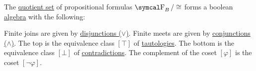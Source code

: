 \begin{Theorem}\label{thm:propositional_logic_boolean_algebra}
  The \hyperref[def:equivalence_relation]{quotient set} of propositional formulas \( \CF_B / \cong \) forms a boolean \hyperref[def:boolean_algebra]{algebra} with the following:
  \begin{ThmEnum}
     Finite joins are given by \hyperref[def:propositional_language/connectives/disjunction]{disjunctions (\( \vee \))}.
     Finite meets are given by \hyperref[def:propositional_language/connectives/conjunction]{conjunctions (\( \wedge \))}.
     The top is the equivalence class \( [\top] \) of \hyperref[def:propositional_interpretation/tautology]{tautologies}.
     The bottom is the equivalence class \( [\bot] \) of \hyperref[def:propositional_interpretation/contradiction]{contradictions}.
     The complement of the coset \( [\varphi] \) is the coset \hyperref[def:propositional_language/negation]{\( [\neg \varphi] \)}.
  \end{ThmEnum}
\end{Theorem}
